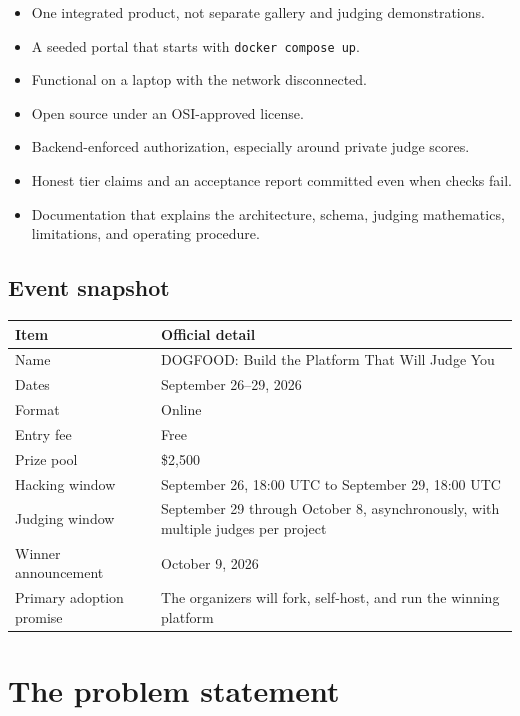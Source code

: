 \documentclass[11pt]{article}
\begin{document}
\begin{itemize}
  \item One integrated product, not separate gallery and judging demonstrations.
  \item A seeded portal that starts with \texttt{docker compose up}.
  \item Functional on a laptop with the network disconnected.
  \item Open source under an OSI-approved license.
  \item Backend-enforced authorization, especially around private judge scores.
  \item Honest tier claims and an acceptance report committed even when checks fail.
  \item Documentation that explains the architecture, schema, judging mathematics, limitations, and operating procedure.
\end{itemize}

\subsection{Event snapshot}

\begin{tabularx}{\linewidth}{@{}L{40mm}Y@{}}
\toprule
\textbf{Item} & \textbf{Official detail}\\
\midrule
Name & DOGFOOD\@: Build the Platform That Will Judge You\\
Dates & September 26--29, 2026\\
Format & Online\\
Entry fee & Free\\
Prize pool & \$2,500\\
Hacking window & September 26, 18:00 UTC to September 29, 18:00 UTC\\
Judging window & September 29 through October 8, asynchronously, with multiple judges per project\\
Winner announcement & October 9, 2026\\
Primary adoption promise & The organizers will fork, self-host, and run the winning platform\\
\bottomrule
\end{tabularx}

\section{The problem statement}
\end{document}
